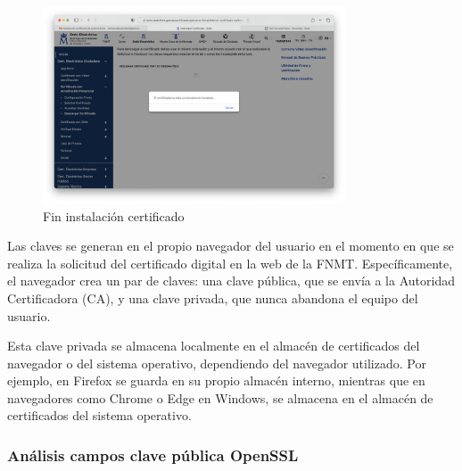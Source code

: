 \begin{figure}[H]   
    \centering
    \includegraphics[width=0.8\textwidth]{fin_instalacion_ej5a.png}
    \caption{Fin instalación certificado}
    \label{fig:fin_instalacion}
\end{figure}

Las claves se generan en el propio navegador del usuario en el momento en que se realiza la solicitud del certificado digital en la web de la FNMT. Específicamente, el navegador crea un par de claves: una clave pública, que se envía a la Autoridad Certificadora (CA), y una clave privada, que nunca abandona el equipo del usuario.  

Esta clave privada se almacena localmente en el almacén de certificados del navegador o del sistema operativo, dependiendo del navegador utilizado. Por ejemplo, en Firefox se guarda en su propio almacén interno, mientras que en navegadores como Chrome o Edge en Windows, se almacena en el almacén de certificados del sistema operativo. 


\subsubsection{Análisis campos clave pública OpenSSL}

